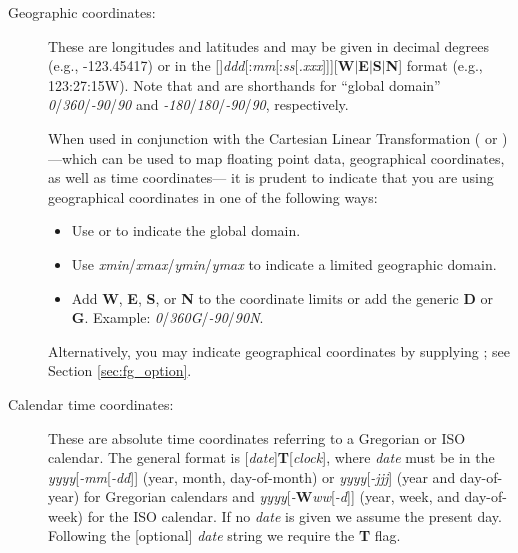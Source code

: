 \begin{description}
\item [Geographic coordinates:]  These are longitudes and latitudes and may be given in decimal degrees (e.g., -123.45417)
or in the
[\PM]\emph{ddd}[:\emph{mm}[:\emph{ss}[\emph{.xxx}]]][\textbf{W}$|$\textbf{E}$|$\textbf{S}$|$\textbf{N}]
format (e.g., 123:27:15W).  Note that  and  are shorthands for ``global domain''
\emph{0}/\emph{360}/\emph{-90}/\emph{90}
and  \emph{-180}/\emph{180}/\emph{-90}/\emph{90}, respectively.

When used in conjunction with the Cartesian Linear Transformation ( or ) ---which can be used
to map floating point data, geographical coordinates, as well as time coordinates--- it is prudent to indicate
that you are using geographical coordinates in one of the following ways:
\begin{itemize}
\item Use  or  to indicate the global domain.
\item Use \emph{xmin}/\emph{xmax}/\emph{ymin}/\emph{ymax} to indicate a limited geographic domain.
\item Add \textbf{W}, \textbf{E}, \textbf{S}, or \textbf{N} to the coordinate limits or add the generic \textbf{D} or
\textbf{G}. Example: \emph{0}/\emph{360G}/\emph{-90}/\emph{90N}.
\end{itemize}
Alternatively, you may indicate geographical coordinates by supplying ; see Section \ref{sec:fg_option}.
\item [Calendar time coordinates:]  These are absolute time coordinates referring to a Gregorian or ISO calendar.
The general format is [\emph{date}]\textbf{T}[\emph{clock}], where \emph{date} must be in the
\emph{yyyy}[\emph{-mm}[\emph{-dd}]] (year, month, day-of-month)
or \emph{yyyy}[\emph{-jjj}] (year and day-of-year) for Gregorian calendars and
\emph{yyyy}[\emph{-}\textbf{W}\emph{ww}[\emph{-d}]] (year, week, and
day-of-week) for the ISO calendar.  If no \emph{date} is given we assume the present day.  Following the
[optional] \emph{date} string we require the \textbf{T} flag.


\end{description}
